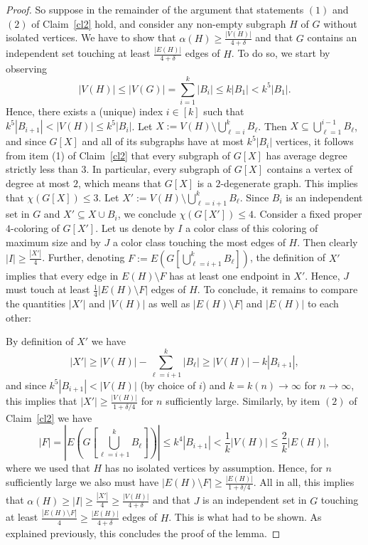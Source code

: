 \documentclass[a4paper,10pt]{amsart}
\begin{document}
\begin{proof}
So suppose in the remainder of the argument that statements $(1)$ and $(2)$ of Claim~\ref{cl2} hold, and consider any non-empty subgraph $H$ of $G$ without isolated vertices. We have to show that $\alpha(H)\ge \frac{|V(H)|}{4+\delta}$ and that $G$ contains an independent set touching at least $\frac{|E(H)|}{4+\delta}$ edges of $H$. To do so, we start by observing
$$|V(H)|\le |V(G)|=\sum_{i=1}^{k}|B_i|\le k|B_1|<k^{5}|B_1|.$$ 
Hence, there exists a (unique) index $i\in [k]$ such that $k^5|B_{i+1}|<|V(H)|\le k^5|B_i|$. Let $X:=V(H)\setminus\bigcup_{\ell=i}^{k} B_\ell$. Then $X\subseteq \bigcup_{\ell=1}^{i-1}B_\ell$, and since $G[X]$ and all of its subgraphs have at most $k^5|B_i|$ vertices, it follows from item (1) of Claim~\ref{cl2} that every subgraph of $G[X]$ has average degree strictly less than $3$. In particular, every subgraph of $G[X]$ contains a vertex of degree at most $2$, which means that $G[X]$ is a $2$-degenerate graph. This implies that $\chi(G[X])\le 3$. Let $X':=V(H)\setminus \bigcup_{\ell=i+1}^{k} B_\ell$. Since $B_i$ is an independent set in $G$ and $X'\subseteq X \cup B_i$, we conclude $\chi(G[X'])\le 4$. Consider a fixed proper $4$-coloring of $G[X']$. Let us denote by $I$ a color class of this coloring of maximum size and by $J$ a color class touching the most edges of $H$. Then clearly $|I|\ge \frac{|X'|}{4}$. Further, denoting $F:=E\left(G\left[\bigcup_{\ell=i+1}^{k}B_\ell\right]\right)$, the definition of $X'$ implies that every edge in $E(H)\setminus F$ has at least one endpoint in $X'$. Hence, $J$ must touch at least $\frac{1}{4}|E(H)\setminus F|$ edges of $H$. To conclude, it remains to  compare the quantities $|X'|$ and $|V(H)|$ as well as $|E(H)\setminus F|$ and $|E(H)|$ to each other: 

By definition of $X'$ we have
$$|X'|\ge |V(H)|-\sum_{\ell=i+1}^{k}|B_\ell|\ge |V(H)|-k|B_{i+1}|,$$
and since $k^5|B_{i+1}|<|V(H)|$ (by choice of $i$) and $k=k(n)\rightarrow \infty$ for $n\rightarrow \infty$, this implies that $|X'|\ge \frac{|V(H)|}{1+\delta/4}$ for $n$ sufficiently large. Similarly, by item $(2)$ of Claim~\ref{cl2} we have
$$|F|=\left|E\left(G\left[\bigcup_{\ell=i+1}^{k}B_\ell\right]\right)\right|\le k^{4}|B_{i+1}|<\frac{1}{k}|V(H)|\le \frac{2}{k}|E(H)|,$$
where we used that $H$ has no isolated vertices by assumption. Hence, for $n$ sufficiently large we also must have $|E(H)\setminus F|\ge \frac{|E(H)|}{1+\delta/4}$. All in all, this implies that
$\alpha(H)\ge |I|\ge \frac{|X'|}{4}\ge \frac{|V(H)|}{4+\delta}$ and that $J$ is an independent set in $G$ touching at least $\frac{|E(H)\setminus F|}{4}\ge \frac{|E(H)|}{4+\delta}$ edges of $H$. This is what had to be shown. As explained previously, this concludes the proof of the lemma.
\end{proof}
\end{document}

